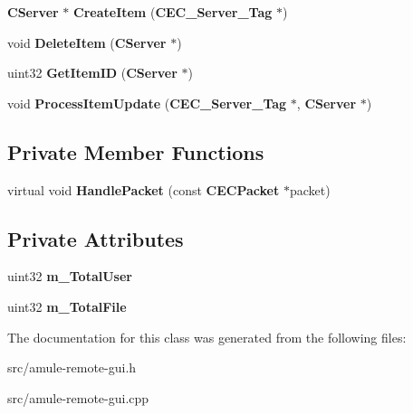 \begin{DoxyCompactItemize}
\item 
{\bf CServer} $\ast$ {\bfseries CreateItem} ({\bf CEC\_\-Server\_\-Tag} $\ast$)\label{classCServerListRem_a9abc13c61492e8f2f4706200632bef71}

\item 
void {\bfseries DeleteItem} ({\bf CServer} $\ast$)\label{classCServerListRem_aa9d3e29ddad7d9e0f1124e4fae44c3a2}

\item 
uint32 {\bfseries GetItemID} ({\bf CServer} $\ast$)\label{classCServerListRem_a252e5cfef0b503e8df5cfa14ba48af9f}

\item 
void {\bfseries ProcessItemUpdate} ({\bf CEC\_\-Server\_\-Tag} $\ast$, {\bf CServer} $\ast$)\label{classCServerListRem_a5e36ad46f0439c8554ec8040e6eb1941}

\end{DoxyCompactItemize}
\subsection*{Private Member Functions}
\begin{DoxyCompactItemize}
\item 
virtual void {\bfseries HandlePacket} (const {\bf CECPacket} $\ast$packet)\label{classCServerListRem_a2bbd8951794ce7092f993bef8696226b}

\end{DoxyCompactItemize}
\subsection*{Private Attributes}
\begin{DoxyCompactItemize}
\item 
uint32 {\bfseries m\_\-TotalUser}\label{classCServerListRem_ac68bbdb534927efb00d629ef68a3fa63}

\item 
uint32 {\bfseries m\_\-TotalFile}\label{classCServerListRem_aaf95e7d3901f4d5338bbec75b9dd25db}

\end{DoxyCompactItemize}


The documentation for this class was generated from the following files:\begin{DoxyCompactItemize}
\item 
src/amule-\/remote-\/gui.h\item 
src/amule-\/remote-\/gui.cpp\end{DoxyCompactItemize}
